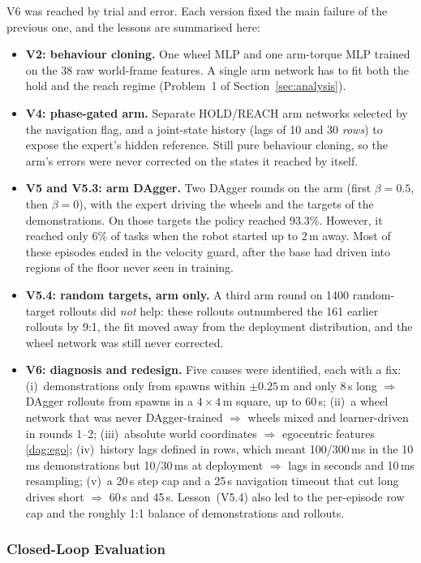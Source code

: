 \documentclass[conference]{IEEEtran}
\begin{document}
V6 was reached by trial and error. Each version fixed the main failure of the previous one, and the lessons are summarised here:
\begin{itemize}
  \item \textbf{V2: behaviour cloning.} One wheel MLP and one arm-torque MLP trained on the 38 raw world-frame features. A single arm network has to fit both the hold and the reach regime (Problem~1 of Section~\ref{sec:analysis}).
  \item \textbf{V4: phase-gated arm.} Separate HOLD/REACH arm networks selected by the navigation flag, and a joint-state history (lags of 10 and 30 \emph{rows}) to expose the expert's hidden reference. Still pure behaviour cloning, so the arm's errors were never corrected on the states it reached by itself.
  \item \textbf{V5 and V5.3: arm DAgger.} Two DAgger rounds on the arm (first $\beta=0.5$, then $\beta=0$), with the expert driving the wheels and the targets of the demonstrations. On those targets the policy reached 93.3\%. However, it reached only 6\% of tasks when the robot started up to 2\,m away. Most of these episodes ended in the velocity guard, after the base had driven into regions of the floor never seen in training.
  \item \textbf{V5.4: random targets, arm only.} A third arm round on 1400 random-target rollouts did \emph{not} help: these rollouts outnumbered the 161 earlier rollouts by 9:1, the fit moved away from the deployment distribution, and the wheel network was still never corrected.
  \item \textbf{V6: diagnosis and redesign.} Five causes were identified, each with a fix: (i)~demonstrations only from spawns within $\pm0.25$\,m and only 8\,s long $\Rightarrow$ DAgger rollouts from spawns in a $4\times4$\,m square, up to 60\,s; (ii)~a wheel network that was never DAgger-trained $\Rightarrow$ wheels mixed and learner-driven in rounds 1--2; (iii)~absolute world coordinates $\Rightarrow$ egocentric features \eqref{dag:ego}; (iv)~history lags defined in rows, which meant 100/300\,ms in the 10\,ms demonstrations but 10/30\,ms at deployment $\Rightarrow$ lags in seconds and 10\,ms resampling; (v)~a 20\,s step cap and a 25\,s navigation timeout that cut long drives short $\Rightarrow$ 60\,s and 45\,s. Lesson~(V5.4) also led to the per-episode row cap and the roughly 1:1 balance of demonstrations and rollouts.
\end{itemize}

\subsubsection{Closed-Loop Evaluation}
\label{dag:results}
\end{document}
